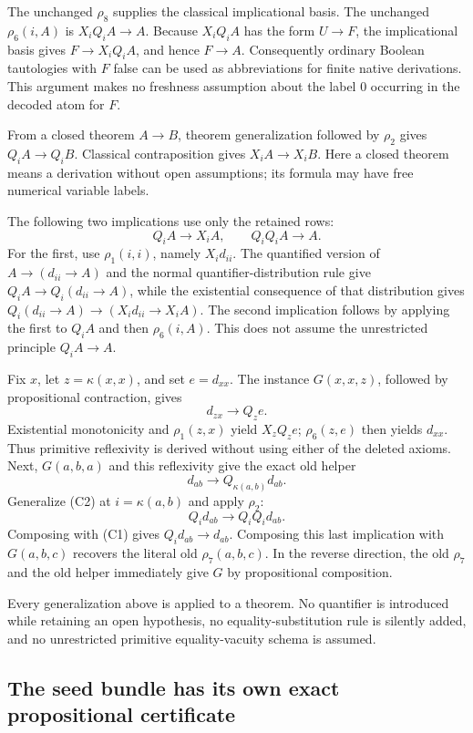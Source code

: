 The unchanged $\rho_8$ supplies the classical implicational basis.
The unchanged $\rho_6(i,A)$ is $X_iQ_iA\to A$.  Because $X_iQ_iA$
has the form $U\to F$, the implicational basis gives
$F\to X_iQ_iA$, and hence $F\to A$.  Consequently ordinary Boolean
tautologies with $F$ false can be used as abbreviations for finite
native derivations.  This argument makes no freshness assumption about
the label $0$ occurring in the decoded atom for $F$.

From a closed theorem $A\to B$, theorem generalization followed by
$\rho_2$ gives $Q_iA\to Q_iB$.  Classical contraposition gives
$X_iA\to X_iB$.  Here a closed theorem means a derivation without open
assumptions; its formula may have free numerical variable labels.

The following two implications use only the retained rows:
\[
 Q_iA\to X_iA, \qquad Q_iQ_iA\to A.                 \tag{C1}
\]
For the first, use $\rho_1(i,i)$, namely $X_id_{ii}$.
The quantified version of $A\to(d_{ii}\to A)$ and the normal
quantifier-distribution rule give
$Q_iA\to Q_i(d_{ii}\to A)$, while the existential consequence of
that distribution gives
$Q_i(d_{ii}\to A)\to(X_id_{ii}\to X_iA)$.
The second implication follows by applying the first to $Q_iA$ and
then $\rho_6(i,A)$.  This does not assume the unrestricted principle
$Q_iA\to A$.

Fix $x$, let $z=\kappa(x,x)$, and set $e=d_{xx}$.
The instance $G(x,x,z)$, followed by propositional contraction, gives
\[
 d_{zx}\to Q_ze.
\]
Existential monotonicity and $\rho_1(z,x)$ yield $X_zQ_ze$;
$\rho_6(z,e)$ then yields $d_{xx}$.  Thus primitive reflexivity is
derived without using either of the deleted axioms.  Next,
$G(a,b,a)$ and this reflexivity give the exact old helper
\[
                 d_{ab}\to Q_{\kappa(a,b)}d_{ab}.       \tag{C2}
\]
Generalize (C2) at $i=\kappa(a,b)$ and apply $\rho_2$:
\[
 Q_i d_{ab}\to Q_iQ_i d_{ab}.
\]
Composing with (C1) gives $Q_i d_{ab}\to d_{ab}$.  Composing this
last implication with $G(a,b,c)$ recovers the literal old
$\rho_7(a,b,c)$.  In the reverse direction, the old $\rho_7$ and
the old helper immediately give $G$ by propositional composition.

Every generalization above is applied to a theorem.  No quantifier is
introduced while retaining an open hypothesis, no equality-substitution
rule is silently added, and no unrestricted primitive equality-vacuity
schema is assumed.

\subsection{The seed bundle has its own exact propositional certificate}

